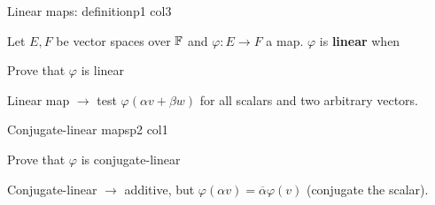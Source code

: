 \documentclass[sheet,noautoquant,noautokw]{neyvia-study}
\begin{document}
\begin{concept}[1.31]{Linear maps: definition}{p1 col3}
\begin{definition}
\noindent Let $E,F$ be vector spaces over $\mathbb{F}$ and $\varphi:E\to F$ a map. $\varphi$ is \textbf{linear} when
\end{definition}
\begin{method}{Prove that $\varphi$ is linear}
\end{method}
\begin{reflex}
Linear map \ensuremath{\rightarrow} test $\varphi(\alpha v+\beta w)$ for all scalars and two arbitrary vectors.
\end{reflex}
\end{concept}
\begin{concept}[1.32]{Conjugate-linear maps}{p2 col1}
\begin{definition}
\end{definition}
\begin{method}{Prove that $\varphi$ is conjugate-linear}
\end{method}
\begin{reflex}
Conjugate-linear \ensuremath{\rightarrow} additive, but $\varphi(\alpha v)=\overline{\alpha}\varphi(v)$ (conjugate the scalar).
\end{reflex}
\end{concept}
\end{document}
